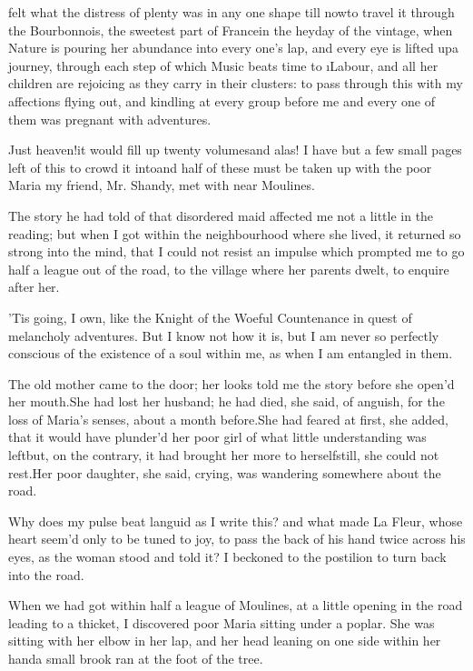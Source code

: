 \documentclass[twoside]{article}
\begin{document}

\vskip 6pt


 felt what the distress
of plenty was in any one shape till
now\tskk to travel it through the
Bourbonnois, the sweetest part of
France\tskk in the heyday of the vintage,
when Nature is pouring her abundance into
every one’s lap, and every eye is lifted
up\tskk a journey, through each step of
which Music beats time to \i{Labour}, and
all her children are rejoicing as they
carry in their clusters: to pass through
this with my affections flying out, and
kindling at every group before me\tskk
and every one of them was pregnant with
adventures.\tskk 

Just heaven!\tskk it would fill up twenty
volumes\tskk and alas! I have but a few
small pages left of this to crowd it
into\tskk and half of these must be taken
up with the poor Maria my friend, Mr.
Shandy, met with near Moulines.

The story he had told of that disordered
maid affected me not a little in the
reading; but when I got within the
neighbourhood where she lived, it returned
so strong into the mind, that I could not
resist an impulse which prompted me to go
half a league out of the road, to the
village where her parents dwelt, to
enquire after her.

’Tis going, I own, like the Knight of the
Woeful Countenance in quest of melancholy
adventures.  But I know not how it is, but
I am never so perfectly conscious of the
existence of a soul within me, as when I
am entangled in them.

The old mother came to the door; her looks
told me the story before she open’d her
mouth.\tskk She had lost her husband; he
had died, she said, of anguish, for the
loss of Maria’s senses, about a month
before.\tskk She had feared at first, she
added, that it would have plunder’d her
poor girl of what little understanding was
left\tskk but, on the contrary, it had
brought her more to herself\tskk still,
she could not rest.\tskk Her poor
daughter, she said, crying, was wandering
somewhere about the road.

Why does my pulse beat languid as I write
this? and what made La Fleur, whose heart
seem’d only to be tuned to joy, to pass
the back of his hand twice across his
eyes, as the woman stood and told it?  I
beckoned to the postilion to turn back
into the road.

When we had got within half a league of
Moulines, at a little opening in the road
leading to a thicket, I discovered poor
Maria sitting under a poplar.  She was
sitting with her elbow in her lap, and her
head leaning on one side within her
hand\tskk a small brook ran at the foot
of the tree.
\end{document}
